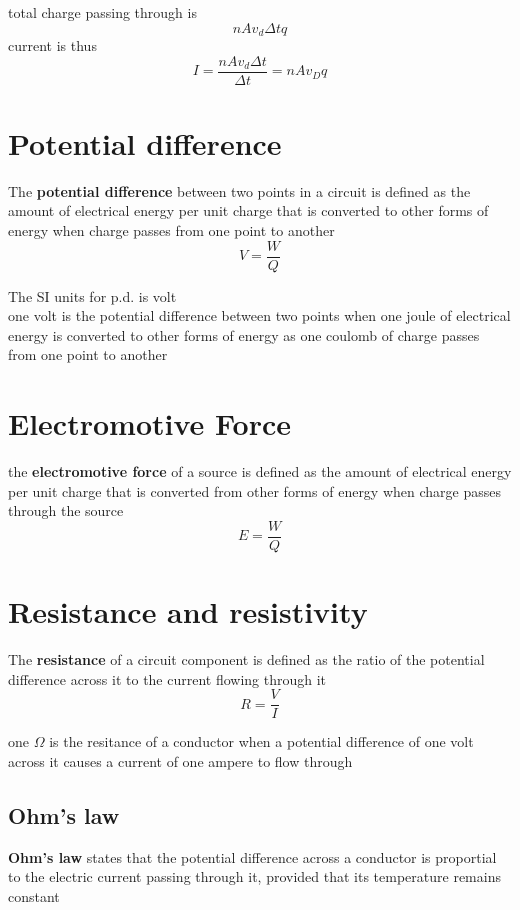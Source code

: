 \documentclass[a4paper, 10pt]{article}
\begin{document}
total charge passing through is 
\[
nA v_d \Delta t q
\]
current is thus
\[
I = \frac{nAv_d \Delta t}{\Delta t} = nAv_Dq 
\]



\section{Potential difference}

\begin{framed}
   The \textbf{potential difference} between two points in a circuit is defined as the amount of electrical energy per unit charge that is converted to other forms of energy when charge passes from one point to another
   \[
   V = \frac{W}{Q}
   \]

   The SI units for p.d. is volt \\
   one volt is the potential difference between two points when one joule of electrical energy is converted to other forms of energy as one coulomb of charge passes from one point to another
\end{framed}	

\section{Electromotive Force}
\begin{framed}
   the \textbf{electromotive force} of a source is defined as the amount of electrical energy per unit charge that is converted from other forms of energy when charge passes through the source
   \[
   E = \frac{W}{Q}
   \]
\end{framed}	

\section{Resistance and resistivity}
\begin{framed}
   The \textbf{resistance} of a circuit component is defined as the ratio of the potential difference across it to the current flowing through it
   \[
   R = \frac{V}{I}
   \]

   one \textbf{$\Omega$} is the resitance of a conductor when a potential difference of one volt across it causes a current of one ampere to flow through
\end{framed}	

\subsection{Ohm's law}
\begin{framed}
   \textbf{Ohm's law} states that the potential difference across a conductor is proportial to the electric current passing through it, provided that its temperature remains constant
\end{framed}	
\end{document}

